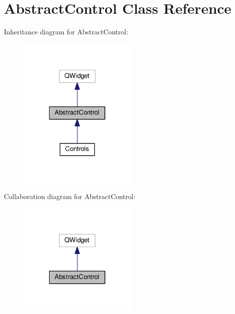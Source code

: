 \hypertarget{class_abstract_control}{\section{Abstract\-Control Class Reference}
\label{class_abstract_control}
}


Inheritance diagram for Abstract\-Control\-:
\nopagebreak
\begin{figure}[H]
\begin{center}
\leavevmode
\includegraphics[width=164pt]{class_abstract_control__inherit__graph}
\end{center}
\end{figure}


Collaboration diagram for Abstract\-Control\-:
\nopagebreak
\begin{figure}[H]
\begin{center}
\leavevmode
\includegraphics[width=164pt]{class_abstract_control__coll__graph}
\end{center}
\end{figure}
